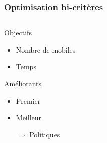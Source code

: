 \begin{frame}
	\frametitle{Optimisation bi-critères}
	\begin{columns}
		\begin{column}{.37\linewidth}
			\begin{alertblock}{Objectifs}
				\begin{itemize}
					\item Nombre de mobiles
					\item Temps
				\end{itemize}
			\end{alertblock}
			\begin{exampleblock}{Améliorants}
				\begin{itemize}
					\item Premier
					\item Meilleur
					\item[$\Rightarrow$] Politiques
				\end{itemize}
			\end{exampleblock}
		\end{column}
		\begin{column}{.63\linewidth}
			\begin{center}
			
			\end{center}
		\end{column}
	\end{columns}
\end{frame}

